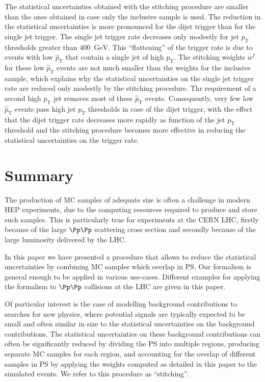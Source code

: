 \documentclass[twocolumn,epjc3]{svjour3}
\newcommand{\pT}{\ensuremath{p_{\textrm{T}}}\xspace}
\newcommand{\pThat}{\ensuremath{\hat{p}_{\textrm{T}}}\xspace}
\newcommand{\GeV}{\ensuremath{\textrm{GeV}}\xspace}
\begin{document}
The statistical uncertainties obtained with the stitching procedure are smaller than the ones obtained in case only the inclusive sample is used.
The reduction in the statistical uncertainties is more pronounced for the dijet trigger than for the single jet trigger.
The single jet trigger rate decreases only modestly for jet $\pT$ thresholds greater than $400$~\GeV.
This ``flattening'' of the trigger rate is due to events with low $\pThat$ that contain a single jet of high $\pT$.
The stitching weights $w^{I}$ for these low $\pThat$ events are not much smaller than the weights for the inclusive sample,
which explains why the statistical uncertainties on the single jet trigger rate are reduced only modestly by the stitching procedure.
Thr requirement of a second high $\pT$ jet removes most of these $\pThat$ events.
Consequently, very few low $\pThat$ events pass high jet $\pT$ thresholds in case of the dijet trigger,
with the effect that the dijet trigger rate decreases more rapidly as function of the jet $\pT$ threshold
and the stitching procedure becomes more effective in reducing the statistical uncertainties on the trigger rate.


\section{Summary}
\label{sec:summary}

The production of MC samples of adequate size is often a challenge in modern HEP experiments,
due to the computing resources required to produce and store such samples.
This is particularly true for experiments at the CERN LHC,
firstly because of the large $\Pp\Pp$ scattering cross section and secondly because of the large luminosity delivered by the LHC.

In this paper we have presented a procedure that allows to reduce the statistical uncertainties 
by combining MC samples which overlap in PS.
Our formalism is general enough to be applied in various use-cases.
Different examples for applying the formalism to $\Pp\Pp$ collisions at the LHC are given in this paper.

Of particular interest is the case of modelling background contributions to searches for new physics,
where potential signals are typically expected to be small and often similar in size to the statistical uncertainties on the background contributions.
The statistical uncertainties on these background contributions can often be significantly reduced 
by dividing the PS into multiple regions, producing separate MC samples for each region,
and accounting for the overlap of different samples in PS by applying the weights computed as detailed in this paper to the simulated events.
We refer to this procedure as ``stitching''.
\end{document}
